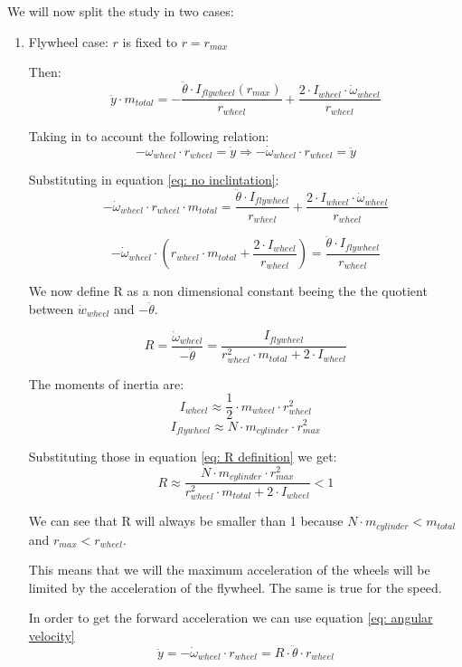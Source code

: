 We will now split the study in two cases:
\begin{enumerate}
    \item Flywheel case: $r$ is fixed to $r = r_{max}$ 
    
    Then:  
    \[\ddot{y}\cdot m_{total} = - \frac{\ddot{\theta}\cdot I_{flywheel}(r_{max})}
    {r_{wheel}} + \frac{2\cdot I_{wheel} \cdot  \dot{\omega}_{wheel}}{r_{wheel}}\]

    Taking in to account the following relation:
    \begin{equation} \label{eq: angular velocity}
        -\omega_{wheel} \cdot  r_{wheel} = \dot{y} \Rightarrow  -\dot{\omega}_{wheel} \cdot  r_{wheel} = \ddot{y}  
    \end{equation}

    Substituting in equation \ref{eq: no inclintation}:
    \[-\dot{\omega}_{wheel} \cdot  r_{wheel}\cdot m_{total} = \frac{\ddot{\theta}\cdot I_{flywheel}}
    {r_{wheel}} + \frac{2\cdot I_{wheel} \cdot  \dot{\omega}_{wheel}}{r_{wheel}} \]

    \[-\dot{\omega}_{wheel} \cdot (r_{wheel}\cdot m_{total} +  \frac{2\cdot I_{wheel} }{r_{wheel}}) = 
    \frac{\ddot{\theta}\cdot I_{flywheel}}{r_{wheel}}\]


    We now define R as a non dimensional constant beeing the the quotient between $\dot{w}_{wheel}$ and $-\ddot{\theta}$.

    \begin{equation}\label{eq: R definition}
        R = \frac{\dot{\omega}_{wheel}}{-\ddot{\theta}} = 
    \frac{I_{flywheel}}
    {r_{wheel}^2\cdot m_{total} +  2\cdot I_{wheel}}
    \end{equation}

    The moments of inertia are:
    \[I_{wheel} \approx \frac{1}{2} \cdot m_{wheel} \cdot  r_{wheel}^2\]
    \[I_{flywheel} \approx N \cdot  m_{cylinder} \cdot  r_{max}^2\]

    Substituting those in equation \ref{eq: R definition} we get:
    \[R \approx
    \frac{ N \cdot  m_{cylinder} \cdot  r_{max}^2}
    {r_{wheel}^2\cdot m_{total} +  2\cdot I_{wheel}} < 1 \] 

    We can see that R will always be smaller than 1 because $N \cdot  m_{cylinder} < m_{total} $ and $r_{max} < r_{wheel}$.
    
    This means that we will the maximum acceleration of the wheels will be limited by the acceleration of the flywheel. The same is true for the speed.

    In  order to get the forward acceleration we can use equation \ref{eq: angular velocity}
    \[\ddot{y} = -\dot{\omega}_{wheel} \cdot  r_{wheel} = R \cdot  \ddot{\theta} \cdot  r_{wheel}\]


\end{enumerate}
